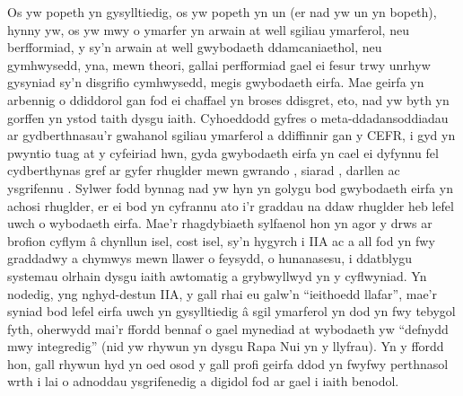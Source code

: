 Os yw popeth yn gysylltiedig, os yw popeth yn un (er nad yw un yn bopeth), hynny yw, os yw mwy o ymarfer yn arwain at well sgiliau ymarferol, neu berfformiad, y sy'n arwain at well gwybodaeth ddamcaniaethol, neu gymhwysedd, yna, mewn theori, gallai perfformiad gael ei fesur trwy unrhyw gysyniad sy'n disgrifio cymhwysedd, megis gwybodaeth eirfa. Mae geirfa yn arbennig o ddiddorol gan fod ei chaffael yn broses ddisgret, eto, nad yw byth yn gorffen yn ystod taith dysgu iaith. Cyhoeddodd \textcite{eun_hee_jeon_understanding_2022} gyfres o meta-ddadansoddiadau ar gydberthnasau'r gwahanol sgiliau ymarferol a ddiffinnir gan y CEFR, i gyd yn pwyntio tuag at y cyfeiriad hwn, gyda gwybodaeth eirfa yn cael ei dyfynnu fel cydberthynas gref ar gyfer rhuglder mewn gwrando \parencite{innami_meta-analysis_2022}, siarad \parencite{jeon_meta-analysis_2022}, darllen \parencite{jeon_updated_2022} ac ysgrifennu \parencite{kojima_meta-analysis_2022}. Sylwer fodd bynnag nad yw hyn yn golygu bod gwybodaeth eirfa yn achosi rhuglder, er ei bod yn cyfrannu ato i'r graddau na ddaw rhuglder heb lefel uwch o wybodaeth eirfa. Mae'r rhagdybiaeth sylfaenol hon yn agor y drws ar brofion cyflym â chynllun isel, cost isel, sy'n hygyrch i IIA ac a all fod yn fwy graddadwy a chymwys mewn llawer o feysydd, o hunanasesu, i ddatblygu systemau olrhain dysgu iaith awtomatig a grybwyllwyd yn y cyflwyniad. Yn nodedig, yng nghyd-destun IIA, y gall rhai eu galw'n ``ieithoedd llafar'', mae'r syniad bod lefel eirfa uwch yn gysylltiedig â sgil ymarferol yn dod yn fwy tebygol fyth, oherwydd mai'r ffordd bennaf o gael mynediad at wybodaeth yw ``defnydd mwy integredig'' (nid yw rhywun yn dysgu Rapa Nui yn y llyfrau). Yn y ffordd hon, gall rhywun hyd yn oed osod y gall profi geirfa ddod yn fwyfwy perthnasol wrth i lai o adnoddau ysgrifenedig a digidol fod ar gael i iaith benodol.

